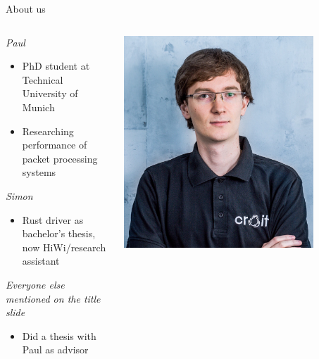 \documentclass[NET,english,aspectratio=169,notitleframe]{tumbeamer}
\begin{document}
\begin{frame}{About us}
\begin{columns}
\begin{column}{0.8\textwidth}
\emph{Paul}
\begin{itemize}
\item PhD student at Technical University of Munich
\item Researching performance of packet processing systems
\end{itemize}
\vfill
\emph{Simon}
\begin{itemize}
\item Rust driver as bachelor's thesis, now HiWi/research assistant
\end{itemize}
\emph{Everyone else mentioned on the title slide}
\begin{itemize}
\item Did a thesis with Paul as advisor
\end{itemize}
\end{column}
\begin{column}{0.15\textwidth}
\includegraphics[width=0.8\textwidth]{pics/paul.jpg}\\

\end{column}
\end{columns}
\end{frame}
\end{document}
